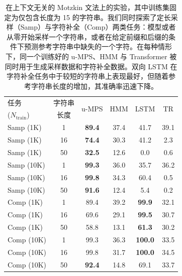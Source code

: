 \documentclass[twoside]{article}
\begin{document}
\begin{table}[t]
\caption{在上下文无关的 Motzkin 文法上的实验，其中训练集固定为仅包含长度为 15 的字符串。我们同时探索了定长采样（Samp）与字符补全（Comp）两类任务：模型或者从零开始采样一个字符串，或者在给定前缀和后缀的条件下预测参考字符串中缺失的一个字符。在每种情形下，同一个训练好的 u-MPS、HMM 与 Transformer 被同时用于生成采样数据和字符补全数据。双向 LSTM 在字符补全任务中于较短的字符串上表现最好，但随着参考字符串长度的增加，其准确率迅速下降。}
\label{tab:motzkin}
\setlength\aboverulesep{0.1pt}
\setlength\belowrulesep{0.1pt}
\renewcommand{\arraystretch}{1.1}
\begin{center}
\begin{small}
\begin{sc}
\begin{tabular}{lc|cccc}
    任务 & 字符串 & \multirow{2}{*}{u-MPS} & \multirow{2}{*}{HMM} & \multirow{2}{*}{LSTM} & \multirow{2}{*}{TR} \\
    ($N_{\mathrm{train}}$) & 长度 &      &  &  &  \\
    \midrule
    Samp (1K)  & 1  & \textbf{89.4} & 37.4 & 41.7           & 39.1 \\
    Samp (1K)  & 16 & \textbf{74.4} & 30.3 & 41.2           & 2.3  \\
    Samp (1K)  & 50 & \textbf{32.5} & 12.6 & 0.0            & 0.6  \\
    Samp (10K) & 1  & \textbf{99.3} & 36.0 & 35.7           & 36.2 \\
    Samp (10K) & 16 & \textbf{99.8} & 34.3 & 60.4           & 0.5  \\
    Samp (10K) & 50 & \textbf{91.6} & 12.4 & 5.4            & 0.2  \\
    Comp (1K)  & 1  & 89.4          & 39.2 & \textbf{99.9}  & 32.1 \\
    Comp (1K)  & 16 & 69.6          & 29.1 & \textbf{99.5}  & 30.7 \\
    Comp (1K)  & 50 & 58.8          & 13.1 & \textbf{61.3}  & 30.2 \\
    Comp (10K) & 1  & 99.3          & 36.3 & \textbf{100.0} & 33.5 \\
    Comp (10K) & 16 & 99.8          & 31.7 & \textbf{100.0} & 34.5 \\
    Comp (10K) & 50 & \textbf{92.4} & 14.8 & 69.1           & 33.7 \\

\end{tabular}
\end{sc}
\end{small}
\end{center}
\vskip -0.1in
\end{table}
\end{document}
